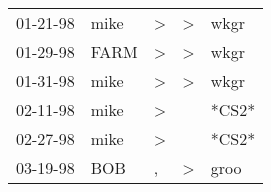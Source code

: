\begin{supertabular}{p{0.07\textwidth}p{0.06\textwidth}p{0.02\textwidth}p{0.02\textwidth}p{0.06\textwidth}}
 01-21-98\textsuperscript{} &  mike\textsuperscript{} &  \textgreater &  \textgreater &  wkgr\textsuperscript{} \\
 01-29-98\textsuperscript{} &  FARM\textsuperscript{} &  \textgreater &  \textgreater &  wkgr\textsuperscript{} \\
 01-31-98\textsuperscript{} &  mike\textsuperscript{} &  \textgreater &  \textgreater &  wkgr\textsuperscript{} \\
 02-11-98\textsuperscript{} &  mike\textsuperscript{} &  \textgreater &               &                   *CS2* \\
 02-27-98\textsuperscript{} &  mike\textsuperscript{} &  \textgreater &               &                   *CS2* \\
 03-19-98\textsuperscript{} &   BOB\textsuperscript{} &             , &  \textgreater &  groo\textsuperscript{} \\
\end{supertabular}
